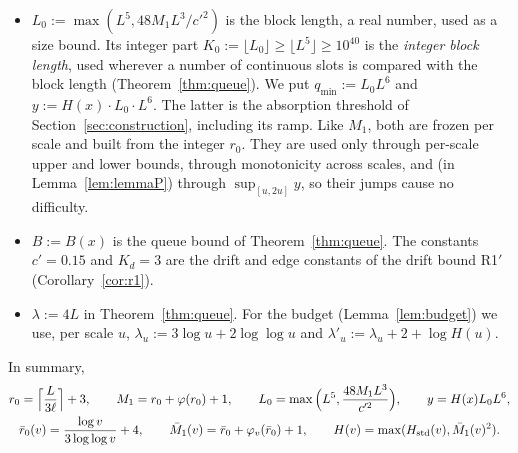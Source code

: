 \begin{itemize}
\begin{itemize}
  \item Where $c(v)=\tfrac14\qHstd(v)^{1/2}$, that is, off the raised range, we have $\bar M_1\le2c=\tfrac12\qHstd^{1/2}$,
    so $H=\qHstd$. This holds in particular for $v\in[X_0,X_0^2]$: there $s\le\log2-\log\Lambda$, so $e^{s/2}\le\sqrt2\,
    \Lambda^{-1/2}$, $\Lambda_s\ge e^{-s}\ge\Lambda/2$ and $A(\Lambda_s,s)\le2\ell$, whence
    $\gamma(s)\Lambda\le10.4\ell+5.2<4\ell^2-\log4$. For heights $v<X_0$ we put $H(v):=\qHstd(v)$; thus $H$ is continuous at
    $X_0$, and $H=\qHstd$ on $[\Xm/2,X_0^2]$.
  \item The \emph{raised range} is the set of heights where $c(v)>\tfrac14\qHstd(v)^{1/2}$, that is, where
    $\gamma(s)\Lambda>4\ell^2-\log4$ (Theorem~\ref{thm:caplw}). There $H=\max(\qHstd,\bar M_1^2)\ge\qHstd$.
  \item In all cases the tolerance $M_1\le H/L^{14}$ of Section~\ref{sec:params} holds.
  \end{itemize}
\item $L_0:=\max(L^5,48M_1L^3/c'^2)$ is the block length, a real number, used as a size bound. Its integer part
  $K_0:=\lfloor L_0\rfloor\ge\lfloor L^5\rfloor\ge10^{40}$ is the \emph{integer block length}, used wherever a number of continuous slots
  is compared with the block length (Theorem~\ref{thm:queue}). We put $q_{\min}:=L_0L^6$ and $y:=H(x)\cdot L_0\cdot L^6$. The
  latter is the absorption threshold of Section~\ref{sec:construction}, including its ramp. Like $M_1$, both are frozen per
  scale and built from the integer $r_0$. They are used only through per-scale upper and lower bounds, through monotonicity
  across scales, and (in Lemma~\ref{lem:lemmaP}) through $\sup_{[u,2u]}y$, so their jumps cause no difficulty.
\item $B:=B(x)$ is the queue bound of Theorem~\ref{thm:queue}. The constants $c'=0.15$ and $K_d=3$ are the drift and edge constants of
  the drift bound R1$'$ (Corollary~\ref{cor:r1}).
\item $\lambda:=4L$ in Theorem~\ref{thm:queue}. For the budget (Lemma~\ref{lem:budget}) we use, per scale $u$,
  $\lambda_u:=3\log u+2\log\log u$ and $\lambda'_u:=\lambda_u+2+\log H(u)$.
\end{itemize}
In summary,
\begin{equation}\label{eq:params}
\begin{gathered}
r_0=\Big\lceil\frac{L}{3\ell}\Big\rceil+3,\qquad M_1=r_0+\varphi(r_0)+1,\qquad
L_0=\max\Big(L^5,\frac{48M_1L^3}{c'^2}\Big),\qquad y=H(x)L_0L^6,\\
\bar r_0(v)=\frac{\log v}{3\log\log v}+4,\qquad \bar M_1(v)=\bar r_0+\varphi_v(\bar r_0)+1,\qquad
H(v)=\max(H_{\mathrm{std}}(v),\bar M_1(v)^2).
\end{gathered}
\end{equation}

